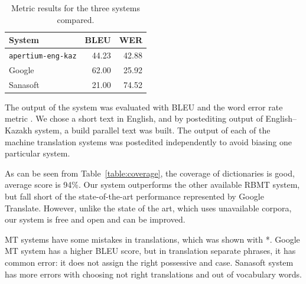 \documentclass[11pt]{article}
\begin{document}
\begin{table}
  \centering
  \begin{tabular}{|l|r|r|}
    \hline
    \textbf{System} & \textbf{BLEU} & \textbf{WER} \\
    \hline
    \texttt{apertium-eng-kaz} & 44.23 & 42.88 \\
    Google & 62.00 & 25.92 \\
    Sanasoft & 21.00 & 74.52 \\
    \hline
  \end{tabular}
  \caption{Metric results for the three systems compared.}
  \label{table:metrics}
\end{table}

The output of the system was evaluated with BLEU \citep{papineni02} and the word error rate 
metric \citep{levenshtein/1966}. We chose a short text in English, and by postediting output 
of English--Kazakh system, a build parallel text was built. The output of each of the machine
translation systems was postedited independently to avoid biasing one particular system.

As can be seen from Table~\ref{table:coverage}, the coverage of dictionaries is good, average score is 94\%. Our system outperforms the other 
available RBMT system, but fall short of the state-of-the-art performance represented by Google Translate. However, unlike the state of 
the art, which uses unavailable corpora, our system is free and open and can be improved.

MT systems have some mistakes in translations, which was shown with *. Google MT system 
has a higher BLEU score, but in translation separate phrases, it has common error: it does not assign 
the right possessive and case. Sanasoft system has more errors with choosing not right translations 
and out of vocabulary words.
\end{document}

